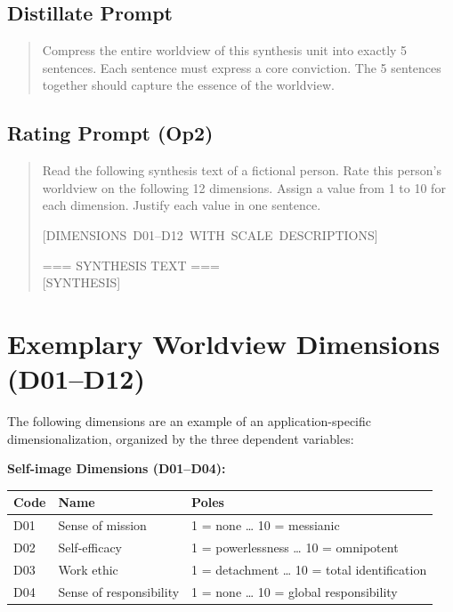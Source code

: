 \documentclass[11pt,a4paper]{article}
\theoremstyle{definition}
\theoremstyle{plain}
\theoremstyle{remark}
\begin{document}
\subsection{Distillate Prompt}

\begin{quote}
\small\ttfamily
Compress the entire worldview of this synthesis unit into exactly 5 sentences. Each sentence must express a core conviction. The 5 sentences together should capture the essence of the worldview.
\end{quote}

\subsection{Rating Prompt (Op2)}

\begin{quote}
\small\ttfamily
Read the following synthesis text of a fictional person. Rate this person's worldview on the following 12 dimensions. Assign a value from 1 to 10 for each dimension. Justify each value in one sentence.

\mbox{[DIMENSIONS D01--D12 WITH SCALE DESCRIPTIONS]}

=== SYNTHESIS TEXT ===\\
\mbox{[SYNTHESIS]}
\end{quote}


\section{Exemplary Worldview Dimensions (D01--D12)}
\label{app:dimensionen}

The following dimensions are an example of an application-specific dimensionalization, organized by the three dependent variables:

\bigskip
\noindent\textbf{Self-image Dimensions (D01--D04):}

\begin{tabularx}{\textwidth}{l l X}
  \toprule
  \textbf{Code} & \textbf{Name} & \textbf{Poles} \\
  \midrule
  D01 & Sense of mission & 1 = none \ldots{} 10 = messianic \\
  D02 & Self-efficacy & 1 = powerlessness \ldots{} 10 = omnipotent \\
  D03 & Work ethic & 1 = detachment \ldots{} 10 = total identification \\
  D04 & Sense of responsibility & 1 = none \ldots{} 10 = global responsibility \\
  \bottomrule
\end{tabularx}
\end{document}
